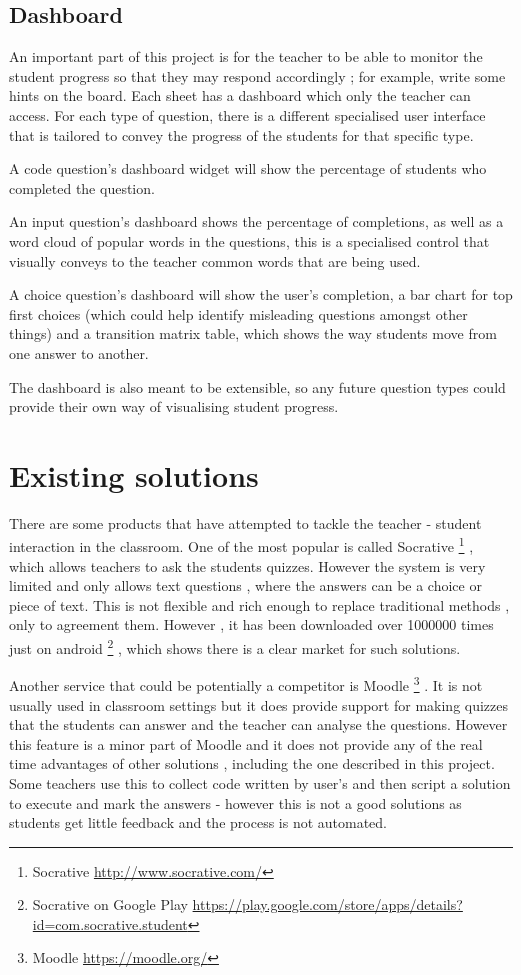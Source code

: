\subsection{Dashboard}
An important part of this project is for the teacher to be able to monitor the student progress so that they may respond accordingly ; for example, write some hints on the board. Each sheet has a dashboard which only the teacher can access.
For each type of question, there is a different specialised user interface that is tailored to convey the progress of the students for that specific type.

A code question's dashboard widget will show the percentage of students who completed the question. 

An input question's dashboard shows the percentage of completions, as well as a word cloud of popular words in the questions, this is a specialised control that visually conveys to the teacher common words that are being used.

A choice question's dashboard will show the user’s completion, a bar chart for top first choices (which could help identify misleading questions amongst other things) and a transition matrix table, which shows the way students move from one answer to another.

The dashboard is also meant to be extensible, so any future question types could provide their own way of visualising student progress.

\section{Existing solutions}
There are some products that have attempted to tackle the teacher - student interaction in the classroom.
One of the most popular is called Socrative \footnote{Socrative \url{http://www.socrative.com/}} , which allows teachers to ask the students quizzes. However the system is very limited and only allows text questions , where the answers can be a choice or piece of text. This is not flexible and rich enough to replace traditional methods , only to agreement them. However , it has been downloaded over 1000000 times just on android \footnote{Socrative on Google Play \url{https://play.google.com/store/apps/details?id=com.socrative.student}} , which shows there is a clear market for such solutions.

Another service that could be potentially a competitor is Moodle \footnote{Moodle \url{https://moodle.org/}} . It is not usually used in classroom settings but it does provide support for making quizzes that the students can answer and the teacher can analyse the questions. However this feature is a minor part of Moodle and it does not provide any of the real time advantages of other solutions , including the one described in this project. Some teachers use this to collect code written by user's and then script a solution to execute and mark the answers - however this is not a good solutions as students get little feedback and the process is not automated.

